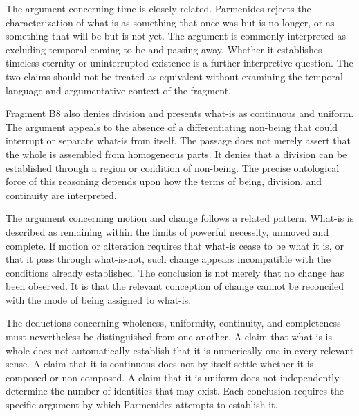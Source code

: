
The argument concerning time is closely related. Parmenides
rejects the characterization of what-is as something that
once was but is no longer, or as something that will be
but is not yet. The argument is commonly interpreted
as excluding temporal coming-to-be and passing-away.
Whether it establishes timeless eternity or uninterrupted
existence is a further interpretive question. The two
claims should not be treated as equivalent without
examining the temporal language and argumentative
context of the fragment.


Fragment B8 also denies division and presents what-is
as continuous and uniform. The argument appeals to
the absence of a differentiating non-being that could
interrupt or separate what-is from itself. The passage
does not merely assert that the whole is assembled
from homogeneous parts. It denies that a division
can be established through a region or condition
of non-being. The precise ontological force of this
reasoning depends upon how the terms of being,
division, and continuity are interpreted.


The argument concerning motion and change follows a
related pattern. What-is is described as remaining
within the limits of powerful necessity, unmoved
and complete. If motion or alteration requires that
what-is cease to be what it is, or that it pass through
what-is-not, such change appears incompatible with
the conditions already established. The conclusion
is not merely that no change has been observed.
It is that the relevant conception of change cannot
be reconciled with the mode of being assigned to
what-is.


The deductions concerning wholeness, uniformity,
continuity, and completeness must nevertheless be
distinguished from one another. A claim that what-is
is whole does not automatically establish that it
is numerically one in every relevant sense. A claim
that it is continuous does not by itself settle
whether it is composed or non-composed. A claim
that it is uniform does not independently determine
the number of identities that may exist. Each
conclusion requires the specific argument by which
Parmenides attempts to establish it.

